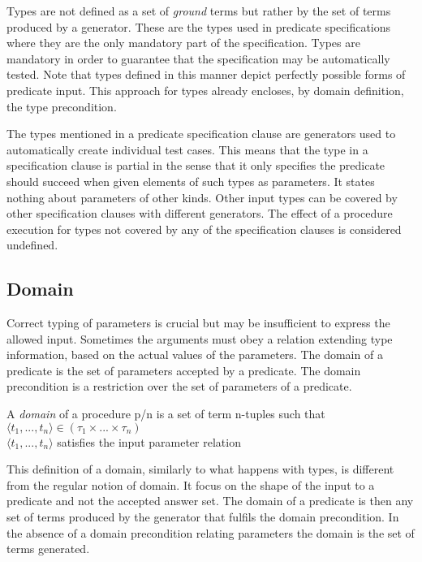 Types are not defined as a set of \emph{ground} terms but rather by
the set of terms produced by a generator.
%
These are the types used in predicate specifications where they are
the only mandatory part of the specification.
%
Types are mandatory in order to guarantee that the specification may be
automatically tested.
%
Note that types defined in this manner depict perfectly possible forms of
predicate input.
%
This approach for types already encloses, by domain definition, the type
precondition.


The types mentioned in a predicate specification clause are \plqc{}
generators used to automatically create individual test cases.
%
This means that the type in a specification clause is partial in the
sense that it only specifies the predicate should succeed when given
elements of such types as parameters.
%
It states nothing about parameters of other kinds.
%
Other input types can be covered by other specification clauses with
different generators.
%
The effect of a procedure execution for types not covered by any of the
specification clauses is considered undefined.


\subsection{Domain}

Correct typing of parameters is crucial but may be insufficient to
express the allowed input.
%
Sometimes the arguments must obey a relation extending type information,
based on the actual values of the parameters.
%
The domain of a predicate is the set of parameters accepted by a
predicate.
%
The domain precondition is a restriction over the set of parameters of a
predicate.


\begin{definition}
\label{def:domain}
A {\em domain} of a procedure p/n is a set of term
n-tuples such that\\
\qquad $\langle t_1,...,t_n \rangle \in (\tau_1 \times ... \times
\tau_n)$\\
\qquad $\langle t_1,...,t_n \rangle$ satisfies the input parameter relation
\end{definition}


This definition of a domain, similarly to what happens with types, is
different from the regular notion of domain.
%
It focus on the shape of the input to a predicate and not the accepted
answer set.
%
The \plqc{} domain of a predicate is then any set of terms produced by
the generator that fulfils the domain precondition.
%
In the absence of a domain precondition relating parameters the domain
is the set of terms generated.


